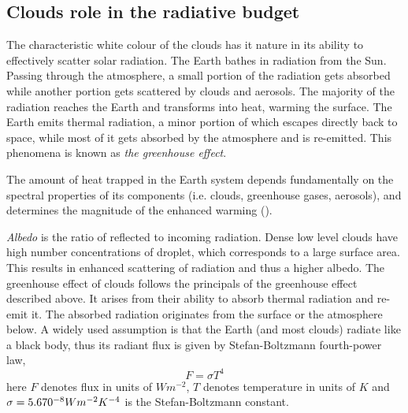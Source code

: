 \subsection{Clouds role in the radiative budget}
The characteristic white colour of the clouds has it nature in its ability to  effectively scatter solar radiation. %
The Earth bathes in radiation from the Sun. Passing through the atmosphere, a small portion of the radiation gets absorbed while another portion gets scattered by clouds and aerosols. The majority of the radiation reaches the Earth and transforms into heat, warming the surface. The Earth emits thermal radiation, a minor portion of which escapes directly back to space, while most of it gets absorbed by the atmosphere and is re-emitted. This phenomena is known as \textit{the greenhouse effect}. 

The amount of heat trapped in the Earth system depends fundamentally on the spectral properties of its components (i.e. clouds, greenhouse gases, aerosols), and determines the magnitude of the enhanced warming (\cite{greenhouse_effect}).

\textit{Albedo} is the ratio of reflected to incoming radiation. Dense low level clouds have high number concentrations of droplet, which corresponds to a large surface area. This results in enhanced scattering of radiation and thus a higher albedo. The greenhouse effect of clouds follows the principals of the greenhouse effect described above. It arises from their ability to absorb thermal radiation and re-emit it. The absorbed radiation originates from the surface or the atmosphere below. A widely used assumption is that the Earth (and most clouds) radiate like a black body, thus its radiant flux is given by Stefan-Boltzmann fourth-power law, 
\begin{equation} \label{eq:stefan-boltzmann}
    F = \sigma T ^4 %
\end{equation}
here $F$ denotes flux in units of $W m^{-2}$, $T$ denotes temperature in units of $K$ and \\  $\sigma = 5.670 \time 10^{-8} W m^{-2} K^{-4}$ is the Stefan-Boltzmann constant. 


